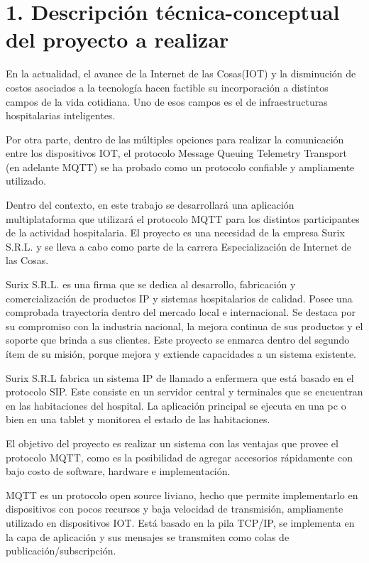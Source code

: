 \documentclass[
11pt, %
]{charter}
\begin{document}
\section{1. Descripción técnica-conceptual del proyecto a realizar}
\label{sec:descripcion}


En la actualidad, el avance de la Internet de las Cosas(IOT) y la disminución de costos asociados a la tecnología hacen factible su incorporación a distintos campos de la vida cotidiana. Uno de esos campos es el de infraestructuras hospitalarias inteligentes. 

Por otra parte, dentro de las múltiples opciones para realizar la comunicación entre los dispositivos IOT, el protocolo Message Queuing Telemetry Transport (en adelante MQTT) se ha probado como un protocolo confiable y ampliamente utilizado.

Dentro del contexto, en este trabajo se desarrollará una aplicación multiplataforma que utilizará el protocolo MQTT para los distintos participantes  de la actividad hospitalaria. El proyecto es una necesidad de la empresa Surix S.R.L. y se lleva a cabo como parte de la carrera Especialización de Internet de las Cosas.

Surix S.R.L. es una firma que se dedica al desarrollo, fabricación y comercialización de productos IP y sistemas hospitalarios de calidad. Posee una comprobada trayectoria dentro del mercado local e internacional. Se destaca por su compromiso con la industria nacional, la mejora continua de sus productos y el soporte que brinda a sus clientes. Este proyecto se enmarca dentro del segundo ítem de su misión, porque mejora y extiende capacidades a un sistema existente. 

Surix S.R.L fabrica un sistema IP de llamado a enfermera que está basado en el protocolo SIP. Este consiste en un servidor central y terminales que se encuentran en las habitaciones del hospital. La aplicación principal se ejecuta en una pc o bien en una tablet y monitorea el estado de las habitaciones. 
 
El objetivo del proyecto es realizar un sistema con las ventajas que provee el protocolo MQTT, como es la posibilidad de agregar accesorios rápidamente con bajo costo de software, hardware e implementación. 

MQTT es un protocolo open source liviano, hecho que permite implementarlo en dispositivos con pocos recursos y baja velocidad de transmisión, ampliamente utilizado en dispositivos IOT. Está basado en la pila TCP/IP, se implementa en la capa de aplicación y sus mensajes se transmiten como colas de publicación/subscripción. 
\end{document}

